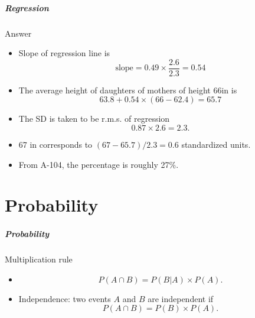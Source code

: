 \documentclass[handout]{beamer}
\begin{document}
   \begin{frame} \frametitle{Regression}

   \begin{block}
   {Answer}
   \begin{itemize}
   \item Slope of regression line is
   $$
   \text{slope} = 0.49 \times \frac{2.6}{2.3} = 0.54
   $$
   \item The average height of daughters of
   mothers of height 66in is
   $$
   63.8 + 0.54 \times (66 - 62.4) = 65.7
   $$

   \item The SD is taken to be r.m.s. of regression
   $$
   0.87 \times 2.6 = 2.3.
   $$


     \item 67 in corresponds to $(67-65.7)/2.3=0.6$ standardized units.

     \item From A-104, the percentage is roughly 27\%.

   \end{itemize}
   \end{block}
   \end{frame}

   \part{Probability}
   \frame{\partpage}


   \begin{frame} \frametitle{Probability}

   \begin{block}
   {Multiplication rule}
   \begin{itemize}
   \item $$P(A \cap B) = P(B|A) \times P(A).
    $$
   \item Independence: two events $A$ and $B$ are independent if
   $$P(A \cap B) = P(B) \times P(A).$$
   \end{itemize}
   \end{block}
   \end{frame}

\end{document}
